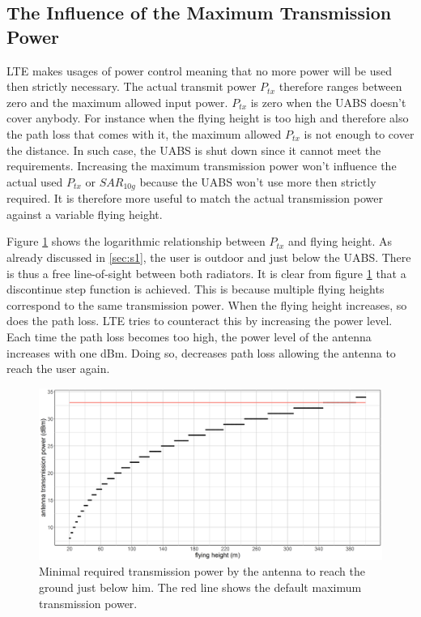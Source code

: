 \subsection{The Influence of the Maximum Transmission Power}
\label{s1a}
\gls{LTE} makes usages of power control meaning that no more power will be used then strictly necessary. The actual 
transmit power $P_{tx}$ therefore ranges between zero and the maximum allowed input power. $P_{tx}$ is zero when the \gls{UABS} doesn't cover anybody.
For instance when the flying height is too high and therefore also the path loss that comes with it, the maximum allowed $P_{tx}$ is not enough to cover 
the distance. In such case, the \gls{UABS} is shut down since it cannot meet the requirements.
Increasing the maximum transmission power won't influence the actual used $P_{tx}$ or $SAR_{10g}$ because the \gls{UABS} won't use more
then strictly required. It is therefore more useful to match the actual transmission power against a variable flying height. 

Figure \ref{fig:ptxfh} shows the logarithmic relationship between $P_{tx}$ and flying height.
As already discussed in \ref{sec:s1}, the user is outdoor and just below the \gls{UABS}. There is thus a free line-of-sight between both
radiators. It is clear  from figure \ref{fig:ptxfh} that a discontinue step function is achieved. This is because multiple flying heights correspond to the same transmission power.
When the flying height increases, so does the path loss. \gls{LTE} tries to counteract this by increasing the power level. Each time 
the path loss becomes too high, the power level of the antenna increases with one dBm. Doing so, decreases path loss allowing the antenna to reach
the user again. 

\begin{figure}[t]
  \centering
  \includegraphics[width=\textwidth]{../results/s1/ptx.png}
  \caption{Minimal required transmission power by the antenna to reach the ground just below him. The red line shows the default maximum transmission power.}
  \label{fig:ptxfh}
\end{figure}

